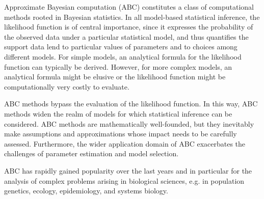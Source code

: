 Approximate Bayesian computation (ABC) constitutes a class of computational methods rooted in Bayesian statistics. In all model-based statistical inference, the likelihood function is of central importance, since it expresses the probability of the observed data under a particular statistical model, and thus quantifies the support data lend to particular values of parameters and to choices among different models. For simple models, an analytical formula for the likelihood function can typically be derived. However, for more complex models, an analytical formula might be elusive or the likelihood function might be computationally very costly to evaluate.

ABC methods bypass the evaluation of the likelihood function. In this way, ABC methods widen the realm of models for which statistical inference can be considered. ABC methods are mathematically well-founded, but they inevitably make assumptions and approximations whose impact needs to be carefully assessed. Furthermore, the wider application domain of ABC exacerbates the challenges of parameter estimation and model selection.

ABC has rapidly gained popularity over the last years and in particular for the analysis of complex problems arising in biological sciences, e.g. in population genetics, ecology, epidemiology, and systems biology.
